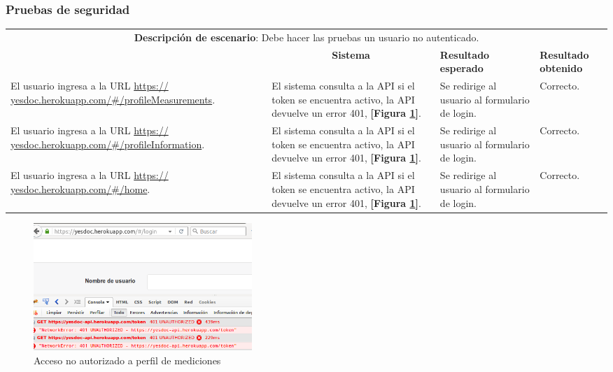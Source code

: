 \subsubsection{Pruebas de seguridad }
\begin{center}
	\begin{longtable}{|m{4cm}|m{4cm}|m{3cm}|m{2cm}|}
		\hline \hline \rowcolor[gray]{0.9}
		\multicolumn{4}{|c|}{\textbf{Procedimiento de pruebas}} \\
		\hline 
		
		\multicolumn{4}{|c|}{\textbf{Descripción de escenario}: Debe hacer las pruebas un usuario no autenticado.} \\
		\hline 
		
		\rowcolor[gray]{0.9}
		\multicolumn{1}{|c|}{\textbf{Actor}} &
		\multicolumn{1}{c|}{\textbf{Sistema}} &
		\textbf{Resultado esperado}&
		\textbf{Resultado obtenido} \\
		\hline
		El usuario ingresa a la URL \url{https:// yesdoc.herokuapp.com/#/profileMeasurements}.
		&
		El sistema consulta a la API si el token se encuentra activo, la API devuelve un error 401, \textbf{[Figura \ref{no_autorizado_profile_measurement}]}.
		&
		Se redirige al usuario al formulario de login.
		&
		Correcto.
		\\ 
		\hline
		El usuario ingresa a la URL \url{https:// yesdoc.herokuapp.com/#/profileInformation}.
		&
		El sistema consulta a la API si el token se encuentra activo, la API devuelve un error 401, \textbf{[Figura \ref{no_autorizado_profile_measurement}]}.
		&
		Se redirige al usuario al formulario de login.
		&
		Correcto.
		\\ 
		\hline
		El usuario ingresa a la URL \url{https:// yesdoc.herokuapp.com/#/home}.
		&
		El sistema consulta a la API si el token se encuentra activo, la API devuelve un error 401, \textbf{[Figura \ref{no_autorizado_profile_measurement}]}.
		&
		Se redirige al usuario al formulario de login.
		&
		Correcto.
		\\ 
		\hline
				
	\end{longtable}
\end{center}
 \begin{figure}[h]
 	\centering
 	\includegraphics[width=0.4\textwidth]{img/no_autorizado_profile_measurement}
 	\caption{Acceso no autorizado a perfil de mediciones}
 	\label{no_autorizado_profile_measurement}
 \end{figure}

